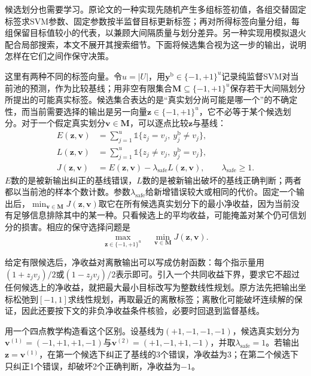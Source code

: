 候选划分也需要学习。原论文的一种实现先随机产生多组标签初值，各组交替固定标签求SVM参数、固定参数按半监督目标更新标签；再对所得标签向量分组，每组保留目标值较小的代表，以兼顾大间隔质量与划分差异。另一种实现用模拟退火配合局部搜索，本文不展开其搜索细节。下面将候选集合视为这一步的输出，说明怎样在它们之间作保守决策。

这里有两种不同的标签向量。令$u=|U|$，用$\bm y^{\mathrm b}\in\{-1,+1\}^u$记录纯监督SVM对当前池的预测，作为比较基线；用非空有限集合$\bm M\subseteq\{-1,+1\}^u$保存若干大间隔划分所提出的可能真实标签。候选集合表达的是“真实划分尚可能是哪一个”的不确定性，而当前需要选择的输出是另一向量$\bm z\in\{-1,+1\}^u$，它不必等于某个候选划分。对于一个假定真实划分$\bm v\in\bm M$，可以逐点比较$\bm z$与基线：
\[
  \begin{aligned}
    E(\bm z,\bm v)
      &=\sum_{j=1}^{u}\mathbb1\{z_j=v_j,\ y_j^{\mathrm b}\ne v_j\},\\
    L(\bm z,\bm v)
      &=\sum_{j=1}^{u}\mathbb1\{z_j\ne v_j,\ y_j^{\mathrm b}=v_j\},\\
    J(\bm z,\bm v)
      &=E(\bm z,\bm v)-\lambda_{\mathrm{safe}}L(\bm z,\bm v),
       \qquad\lambda_{\mathrm{safe}}\geq1.
  \end{aligned}
\]
$E$数的是被新输出纠正的基线错误，$L$数的是被新输出破坏的基线正确判断；两者都以当前池的样本个数计数。参数$\lambda_{\mathrm{safe}}$给新增错误较大或相同的代价。固定一个输出后，$\min_{\bm v\in\bm M}J(\bm z,\bm v)$取它在所有候选真实划分下的最小净收益，因为当前没有足够信息排除其中的某一种。只看候选上的平均收益，可能掩盖对某个仍可信划分的损害。相应的保守选择问题是
\begin{equation}
  \label{eq:classification-s4vm-safe-selection}
  \max_{\bm z\in\{-1,+1\}^{u}}\quad
      \min_{\bm v\in\bm M}J(\bm z,\bm v).
\end{equation}

给定有限候选后，净收益对离散输出可以写成仿射函数：每个指示量用$(1+z_jv_j)/2$或$(1-z_jv_j)/2$表示即可。引入一个共同收益下界，要求它不超过任何候选上的净收益，就把最大最小目标改写为整数线性规划。原方法先把输出坐标松弛到$[-1,1]$求线性规划，再取最近的离散标签；离散化可能破坏连续解的保证，因此还要按下文的非负净收益条件核验，必要时回退到监督基线。

用一个四点教学构造看这个区别。设基线为$(+1,-1,-1,-1)$，候选真实划分为$\bm v^{(1)}=(-1,+1,+1,-1)$与$\bm v^{(2)}=(+1,-1,+1,-1)$，并取$\lambda_{\mathrm{safe}}=1$。若输出$\bm z=\bm v^{(1)}$，在第一个候选下纠正了基线的3个错误，净收益为3；在第二个候选下只纠正1个错误，却破坏2个正确判断，净收益为$-1$。

